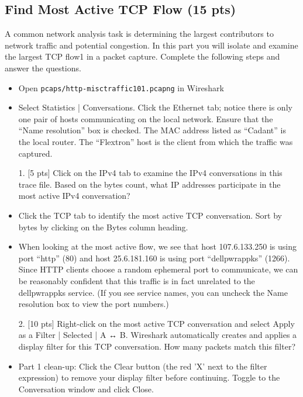 \subsection {Find Most Active TCP Flow (15 pts)}
A common network analysis task is determining the largest contributors to network traffic
and potential congestion. In this part you will isolate and examine the largest TCP flow1
in
a packet capture. Complete the following steps and answer the questions.
\begin{itemize}
\item Open {\tt pcaps/http-misctraffic101.pcapng} in Wireshark
\item Select Statistics | Conversations. Click the Ethernet tab; notice there is only one
pair of hosts communicating on the local network. Ensure that the “Name resolution”
box is checked. The MAC address listed as “Cadant” is the local router. The
“Flextron” host is the client from which the traffic was captured.
\item[1.] [5 pts] Click on the IPv4 tab to examine the IPv4 conversations in this trace file. Based
on the bytes count, what IP addresses participate in the most active IPv4 conversation?
\item Click the TCP tab to identify the most active TCP conversation. Sort by bytes by
clicking on the Bytes column heading.
\item When looking at the most active flow, we see that host 107.6.133.250 is using port
“http” (80) and host 25.6.181.160 is using port “dellpwrappks” (1266). Since HTTP
clients choose a random ephemeral port to communicate, we can be reasonably confident that this traffic is in fact unrelated to the dellpwrappks service. (If you see service
names, you can uncheck the Name resolution box to view the port numbers.)
\item[2.] [10 pts] Right-click on the most active TCP conversation and select Apply as a Filter
| Selected | A ↔ B. Wireshark automatically creates and applies a display filter for
this TCP conversation. How many packets match this filter?
\item Part 1 clean-up: Click the Clear button (the red ’X’ next to the filter expression) to
remove your display filter before continuing. Toggle to the Conversation window and
click Close.
\end {itemize}
